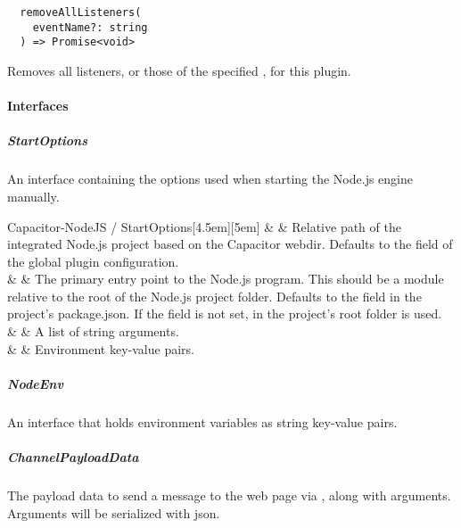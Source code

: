 \begin{verbatim}
  removeAllListeners(
    eventName?: string
  ) => Promise<void>
\end{verbatim}

Removes all listeners, or those of the specified , for this plugin.


\newpage

\paragraph{Interfaces}


\subparagraph{StartOptions}

An interface containing the options used when starting the Node.js engine manually.

\begin{interfacedesc}{Capacitor-NodeJS / StartOptions}[4.5em][5em]
   &    & Relative path of the integrated Node.js project based on the Capacitor webdir. Defaults to the  field of the global plugin configuration. \\ \hline
    &    & The primary entry point to the Node.js program. This should be a module relative to the root of the Node.js project folder. Defaults to the  field in the project's package.json. If the  field is not set,  in the project's root folder is used. \\ \hline
      &  & A list of string arguments. \\ \hline
       &   & Environment key-value pairs. \\ \hline
\end{interfacedesc}


\subparagraph{NodeEnv}

An interface that holds environment variables as string key-value pairs.


\subparagraph{ChannelPayloadData}

The payload data to send a message to the web page via , along with arguments.
Arguments will be serialized with \ac{json}.

